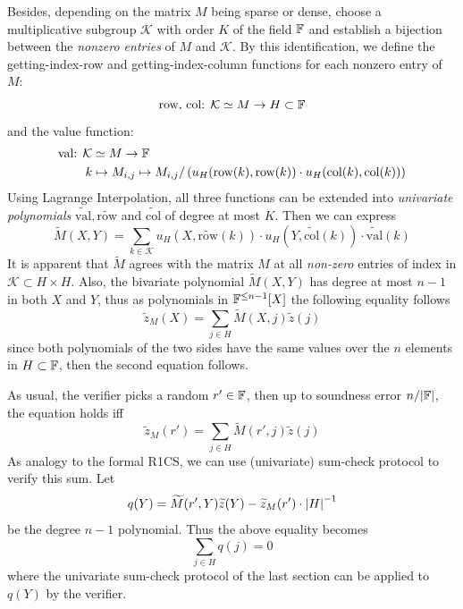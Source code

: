 \documentclass{article}
\begin{document}
Besides, depending on the matrix $M$ being sparse or dense, choose a multiplicative subgroup $\mathcal{K}$ with order $K$ of the field $\mathbb{F}$ and establish a bijection between the \textit{nonzero entries} of $M$ and $\mathcal{K}$. By this identification, we define the getting-index-row and getting-index-column functions for each nonzero entry of $M$:
\begin{equation*}
\text{row, col: } \mathcal{K} \simeq M \rightarrow H \subset \mathbb{F}
\end{equation*}
and the value function:
\begin{equation*}
\begin{split}
\text{val: } \mathcal{K}  & \simeq M  \rightarrow \mathbb{F} \\
 k & \mapsto M_{i, j}  \mapsto M_{i, j} / \left( u_H(\text{row} (k), \text{row}(k)) \cdot u_H(\text{col} (k), \text{col}(k)) \right)
\end{split}
\end{equation*}
Using Lagrange Interpolation, all three functions can be extended into \textit{univariate polynomials} $\widetilde{\text{val}}, \widetilde{\text{row}}$ and $\widetilde{\text{col}}$ of degree at most $K$. Then we can express
\begin{equation*}
\widetilde{M}(X, Y) = \sum_{k \in \mathcal{K}} u_H(X, \widetilde{\text{row}}(k)) \cdot u_H(Y, \widetilde{\text{col}}(k)) \cdot \widetilde{\text{val}}(k)
\end{equation*}
It is apparent that $\widetilde{M}$ agrees with the matrix $M$ at all \textit{non-zero} entries of index in $\mathcal{K} \subset H \times H$. Also, the bivariate polynomial $\widetilde{M}(X, Y)$ has degree at most $n-1$ in both $X$ and $Y$, thus as polynomials in $\mathbb{F}^{\leq n - 1} [X]$ the following equality follows
\begin{equation*}
\widetilde{z}_M(X) = \sum_{j \in H} \widetilde{M}(X, j) \widetilde{z}(j)
\end{equation*}
since both polynomials of the two sides have the same values over the $n$ elements in $H \subset \mathbb{F}$, then the second equation follows.
 
As usual, the verifier picks a random $r' \in \mathbb{F}$, then up to soundness error $n/\abs{\mathbb{F}}$, the equation holds iff 
\begin{equation*}
\widetilde{z}_M(r') = \sum_{j \in H} \widetilde{M}(r', j) \widetilde{z}(j)
\end{equation*}
As analogy to the formal R1CS, we can use (univariate) sum-check protocol to verify this sum. Let
\begin{equation*}
q(Y) = \widetilde{M}(r', Y) \widetilde{z}(Y) - \widetilde{z}_M(r') \cdot \abs{H}^{-1}
\end{equation*}
be the degree $n-1$ polynomial. Thus the above equality becomes
\begin{equation*}
\sum_{j \in H} q(j) = 0
\end{equation*}
where the univariate sum-check protocol of the last section can be applied to $q(Y)$ by the verifier.
\end{document}
